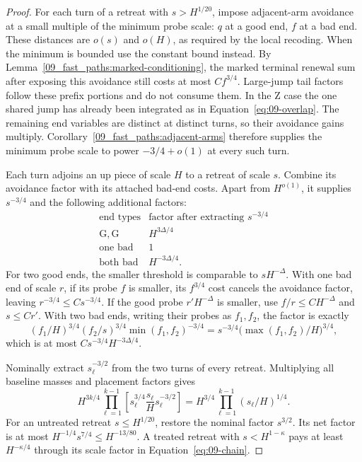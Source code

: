 \begin{proof}
For each turn of a retreat with \(s>H^{1/20}\), impose adjacent-arm
avoidance at a small multiple of the minimum probe scale: \(q\) at
a good end, \(f\) at a bad end.  These distances are \(o(s)\) and
\(o(H)\), as required by the local recoding.  When the minimum is
bounded use the constant bound instead.  By
Lemma~\ref{09_fast_paths:marked-conditioning}, the marked terminal
renewal sum after exposing this avoidance still costs at most
\(Cf^{3/4}\).  Large-jump tail factors follow these prefix portions
and do not consume them.  In the \(\mathrm Z\) case the one shared
jump has already been integrated as in Equation~\eqref{eq:09-overlap}.
The remaining end variables are distinct at distinct turns, so their
avoidance gains multiply.  Corollary~\ref{09_fast_paths:adjacent-arms}
therefore supplies the minimum probe scale to power
\(-3/4+o(1)\) at every such turn.

Each turn adjoins an up piece of scale \(H\) to a retreat of scale
\(s\).  Combine its avoidance factor with its attached bad-end
costs.  Apart from \(H^{o(1)}\), it supplies \(s^{-3/4}\) and
the following additional factors:
\[
\begin{array}{c|c}
 \text{end types}&\text{factor after extracting }s^{-3/4}\\ \hline
 \mathrm G,\mathrm G&H^{3\Delta/4}\\
 \text{one bad}&1\\
 \text{both bad}&H^{-3\Delta/4}.
\end{array}
\]
For two good ends, the smaller threshold is comparable to
\(sH^{-\Delta}\).  With one bad end of scale \(r\), if its probe
\(f\) is smaller, its \(f^{3/4}\) cost cancels the avoidance
factor, leaving \(r^{-3/4}\le Cs^{-3/4}\).  If the good probe
\(r'H^{-\Delta}\) is smaller, use \(f/r\le CH^{-\Delta}\)
and \(s\le Cr'\).  With two bad ends, writing their probes as
\(f_1,f_2\), the factor is exactly
\[
 (f_1/H)^{3/4}(f_2/s)^{3/4}
      \min(f_1,f_2)^{-3/4}
   =s^{-3/4}\bigl(\max(f_1,f_2)/H\bigr)^{3/4},
\]
which is at most \(Cs^{-3/4}H^{-3\Delta/4}\).

Nominally extract \(s_\ell^{-3/2}\) from the two turns of every
retreat.  Multiplying all baseline masses and placement factors gives
\begin{equation}
 H^{3k/4}\prod_{\ell=1}^{k-1}
  \left[s_\ell^{3/4}\frac{s_\ell}{H}s_\ell^{-3/2}\right]
           =H^{3/4}\prod_{\ell=1}^{k-1}(s_\ell/H)^{1/4}.
                                                        \label{eq:09-chain}
\end{equation}
For an untreated retreat \(s\le H^{1/20}\), restore the nominal
factor \(s^{3/2}\).  Its net factor is at most
\(H^{-1/4}s^{7/4}\le H^{-13/80}\).  A treated retreat with
\(s<H^{1-\kappa}\) pays at least \(H^{-\kappa/4}\) through
its scale factor in Equation~\eqref{eq:09-chain}.


\end{proof}
